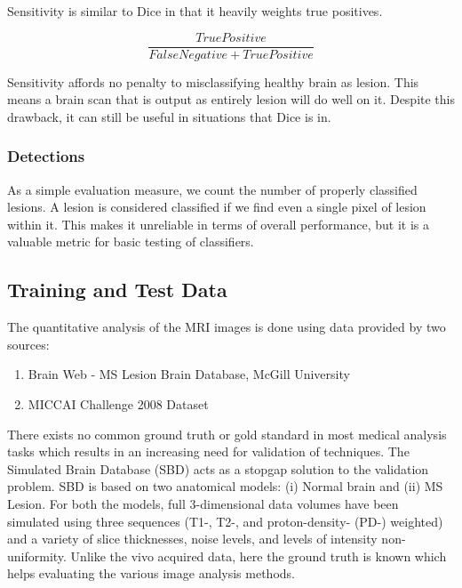 \documentclass{article} %
\begin{document}
Sensitivity is similar to Dice in that it heavily weights true positives.

$$\frac{True Positive}{False Negative + True Positive}$$

Sensitivity affords no penalty to misclassifying healthy brain as lesion. This means a brain scan that is output as entirely lesion will do well on it. Despite this drawback, it can still be useful in situations that Dice is in.

\subsubsection{Detections}

As a simple evaluation measure, we count the number of properly classified lesions. A lesion is considered classified if we find even a single pixel of lesion within it. This makes it unreliable in terms of overall performance, but it is a valuable metric for basic testing of classifiers.

\subsection{Training and Test Data}
The quantitative analysis of the MRI images is done using data provided by two sources:
\begin{enumerate}
\item Brain Web - MS Lesion Brain Database, McGill University
\item MICCAI Challenge 2008 Dataset
\end{enumerate}

There exists no common ground truth or gold standard in most medical analysis tasks which results in an increasing need for validation of techniques. The Simulated Brain Database (SBD) acts as a stopgap solution to the validation problem. SBD is based on two anatomical models: (i) Normal brain and (ii) MS Lesion.  For both the models, full 3-dimensional data volumes have been simulated using three sequences (T1-, T2-, and proton-density- (PD-) weighted) and a variety of slice thicknesses, noise levels, and levels of intensity non-uniformity.  Unlike the vivo acquired data, here the ground truth is known which helps evaluating the various image analysis methods. 
\end{document}
